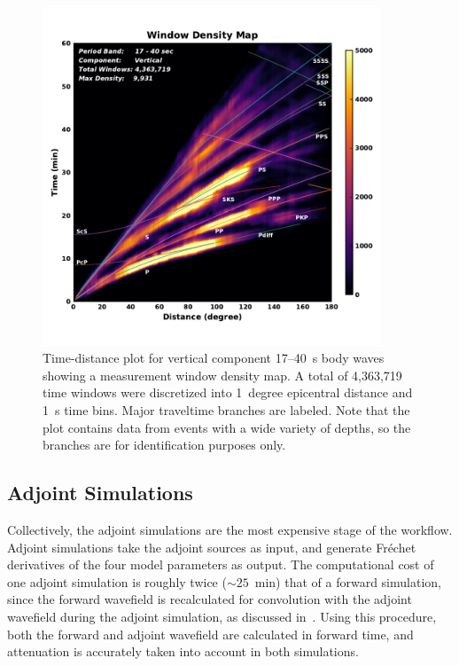 \documentclass[extra,mreferee]{gji}
\begin{document}
\begin{figure}
  \centering
  \includegraphics[width=0.9\textwidth]{figures/window_colorbar_linear_Z.pdf}
  \caption{Time-distance plot for vertical component 17--40~s body waves showing a measurement window density map.
  A total of 4,363,719 time windows were discretized into 1~degree epicentral distance and 1~s time bins. Major traveltime branches are labeled. Note that the plot contains data from events with a wide variety of depths, so the branches are for identification purposes only.
  }
  \label{fig:window_density}
\end{figure}

\subsection{Adjoint Simulations}

Collectively,
the adjoint simulations are the most expensive stage of the workflow. 
Adjoint simulations take the adjoint sources as input, and generate Fr\'echet
derivatives of the four model parameters as output.
The computational cost of one adjoint simulation is roughly twice ($\sim25$~min) that of
a forward simulation, since the forward wavefield is recalculated for convolution with
the adjoint wavefield during the adjoint simulation,
as discussed in~\cite{KoXiBoPeSaLiTr16}.
Using this procedure,
both the forward and adjoint wavefield are calculated in forward time,
and attenuation is accurately taken into account in both simulations.
\end{document}
